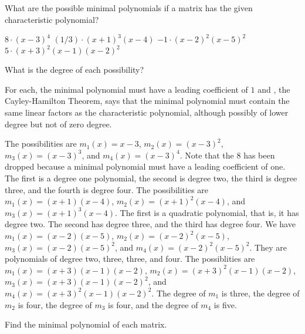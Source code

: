 \begin{exercises}
  \recommended \item 
    What are the possible minimal polynomials if a matrix has
    the given characteristic polynomial?
    \begin{exparts*}
      \partsitem $8\cdot (x-3)^4$
      \partsitem $(1/3)\cdot (x+1)^3(x-4)$
      \partsitem $-1\cdot (x-2)^2(x-5)^2$
      \partsitem  \( 5\cdot(x+3)^2(x-1)(x-2)^2 \)
    \end{exparts*}
    What is the degree of each possibility?
    \begin{answer}
      For each, 
      the minimal polynomial must have a leading coefficient of $1$
      and , the Cayley-Hamilton Theorem, says that
      the minimal polynomial must contain the same linear factors
      as the characteristic polynomial, although possibly of lower degree
      but not of zero degree.
      \begin{exparts}
        \partsitem The possibilities are 
          $m_1(x)=x-3$, $m_2(x)=(x-3)^2$, $m_3(x)=(x-3)^3$,
          and $m_4(x)=(x-3)^4$.
          Note that the $8$ has been dropped because a minimal
          polynomial must have a leading coefficient of one.
          The first is a degree one polynomial, the second is degree two,
          the third is degree three, and the fourth is degree four.
        \partsitem The possibilities are $m_1(x)=(x+1)(x-4)$,
          $m_2(x)=(x+1)^2(x-4)$, and $m_3(x)=(x+1)^3(x-4)$.
          The first is a quadratic polynomial, that is, it has degree two.
          The second has degree three, and the third has degree four.
        \partsitem We have $m_1(x)=(x-2)(x-5)$, $m_2(x)=(x-2)^2(x-5)$,
          $m_3(x)=(x-2)(x-5)^2$, and $m_4(x)=(x-2)^2(x-5)^2$.
          They are polynomials of degree two, three, three, and four.
        \partsitem The possiblities are \( m_1(x)=(x+3)(x-1)(x-2) \),
          \( m_2(x)=(x+3)^2(x-1)(x-2) \),
          \( m_3(x)=(x+3)(x-1)(x-2)^2 \),
          and \( m_4(x)=(x+3)^2(x-1)(x-2)^2 \).
          The degree of $m_1$ is three, the degree of $m_2$ is four,
          the degree of $m_3$ is four, and the degree of $m_4$ is five.
      \end{exparts}
    \end{answer}
  \recommended \item 
    Find the minimal polynomial of each matrix.
\end{exercises}
